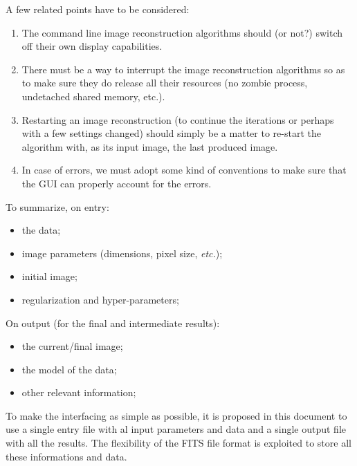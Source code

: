 \documentclass{article}
\begin{document}
A few related points have to be considered:
\begin{enumerate}
  \item The command line image reconstruction algorithms should (or not?)
  switch off their own display capabilities.

  \item There must be a way to interrupt the image reconstruction algorithms
  so as to make sure they do release all their resources (no zombie process,
  undetached shared memory, etc.).

  \item Restarting an image reconstruction (to continue the iterations or
  perhaps with a few settings changed) should simply be a matter to re-start
  the algorithm with, as its input image, the last produced image.

  \item  In case of errors, we must adopt some kind of conventions to make
  sure that the GUI can properly account for the errors.
\end{enumerate}



To summarize, on entry:
\begin{itemize}
\item the data;
\item image parameters (dimensions, pixel size, \emph{etc.});
\item initial image;
\item regularization and hyper-parameters;
\end{itemize}
On output (for the final and intermediate results):
\begin{itemize}
\item the current/final image;
\item the model of the data;
\item other relevant information;
\end{itemize}


To make the interfacing as simple as possible, it is proposed in this document
to use a single entry file with al input parameters and data and a single
output file with all the results.  The flexibility of the FITS file format is
exploited to store all these informations and data.
\end{document}
